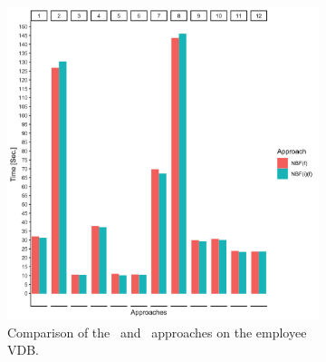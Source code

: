 \begin{figure}[t!]
    \centering
    \begin{subfigure}[t]{0.5\textwidth}
        \centering
        \includegraphics[scale=0.06]{figs/plots/emp-nbf-f.png}
        \caption[Comparison of the \nbff\ and \nbfif\ approaches on the employee VDB]{Comparison of the \nbff\ and \nbfif\ approaches on the employee VDB.}
    \end{subfigure}%
    ~ 
    \begin{subfigure}[t]{0.5\textwidth}
        \centering

\end{subfigure}
\end{figure}
